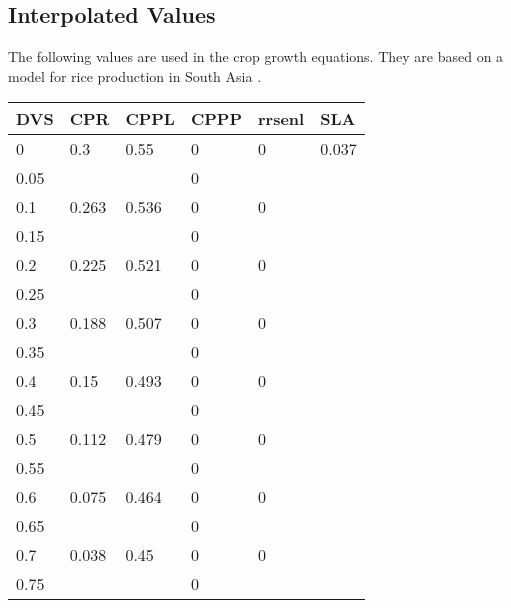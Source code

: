 \subsection{Interpolated Values}
The following values are used in the crop growth equations. They are based on a model for rice production in South Asia \cite{RICEPEST, GENECROP}.
\begin{center}
\begin{tabular}{llllll}
\textbf{DVS} & \textbf{CPR} & \textbf{CPPL} & \textbf{CPPP}  & \textbf{rrsenl} & \textbf{SLA} \\ \hline
0            & 0.3          & 0.55          & 0                           & 0   & 0.037           \\
0.05         &              &               & 0                             &                \\
0.1          & 0.263        & 0.536         & 0                            & 0              \\
0.15         &              &               & 0                         &                \\
0.2          & 0.225        & 0.521         & 0                          & 0              \\
0.25         &              &               & 0                           &                \\
0.3          & 0.188        & 0.507         & 0                       & 0              \\
0.35         &              &               & 0                             &                \\
0.4          & 0.15         & 0.493         & 0                          & 0              \\
0.45         &              &               & 0                         &                \\
0.5          & 0.112        & 0.479         & 0                  & 0              \\
0.55         &              &               & 0                        &                \\
0.6          & 0.075        & 0.464         & 0                     & 0              \\
0.65         &              &               & 0                            &                \\
0.7          & 0.038        & 0.45          & 0                       & 0              \\
0.75         &              &               & 0                            &                \\

\end{tabular}
\end{center}
